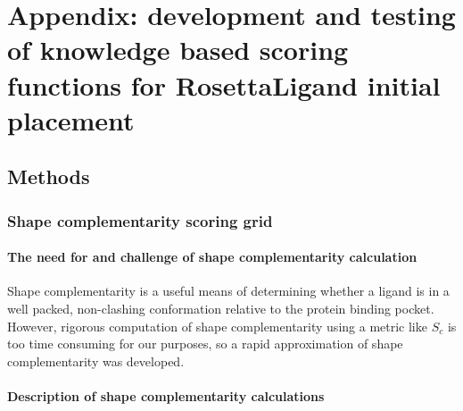 \chapter{Appendix: development and testing of knowledge based scoring functions for RosettaLigand initial placement}
\label{chap:lowres_appendix}
\section{Methods}

\subsection{Shape complementarity scoring grid}

\subsubsection{The need for and challenge of shape complementarity calculation}

Shape complementarity is a useful means of determining whether a ligand is in a well packed, non-clashing conformation relative to the protein binding pocket. 
However, rigorous computation of shape complementarity using a metric like $S_{c}$\citep{Lawrence:1993in}  is too time consuming for our purposes, so a rapid approximation of shape complementarity was developed.

\subsubsection{Description of shape complementarity calculations}

